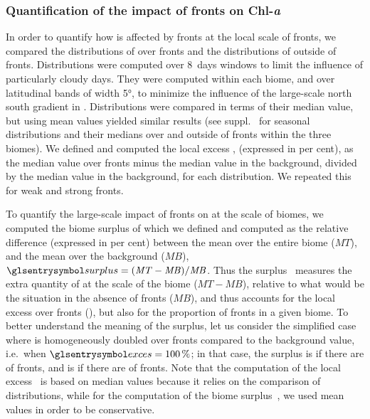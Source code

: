\subsubsection{Quantification of the impact of fronts on Chl-\textit{a}}


In order to quantify how  is affected by fronts at the local scale of fronts, we compared the distributions of  over fronts and the distributions of  outside of fronts.
Distributions were computed over 8~days windows to limit the influence of particularly cloudy days.
They were computed within each biome, and over latitudinal bands of width \ang{5}, to minimize the influence of the large-scale north south gradient in .
Distributions were compared in terms of their median value, but using mean values yielded similar results (see suppl.\  for seasonal distributions and their medians over and outside of fronts within the three biomes).
We defined and computed the local excess ,  (expressed in per cent), as the median value over fronts minus the median value in the background, divided by the median value in the background, for each distribution.
We repeated this for weak and strong fronts.

To quantify the large-scale impact of fronts on  at the scale of biomes, we computed the biome surplus of   which we defined and computed as the relative difference (expressed in per cent) between the mean  over the entire biome (\(\mathit{MT}\)), and the mean  over the background (\(\mathit{MB}\)), \(\am{surplus} = (\mathit{MT}-\mathit{MB}) / \mathit{MB}\).
Thus the surplus~ measures the extra quantity of  at the scale of the biome (\(\mathit{MT} - \mathit{MB}\)), relative to what would be the situation in the absence of fronts (\(\mathit{MB}\)), and thus accounts for the local excess over fronts (), but also for the proportion of fronts in a given biome.
To better understand the meaning of the surplus, let us consider the simplified case where  is homogeneously doubled over fronts compared to the background value, i.e.\ when \(\am{exces} = \pct{100}\); in that case, the surplus  is  if there are  of fronts, and is  if there are  of fronts.
Note that the computation of the local excess~ is based on median values because it relies on the comparison of distributions, while for the computation of the biome surplus~, we used mean values in order to be conservative.


